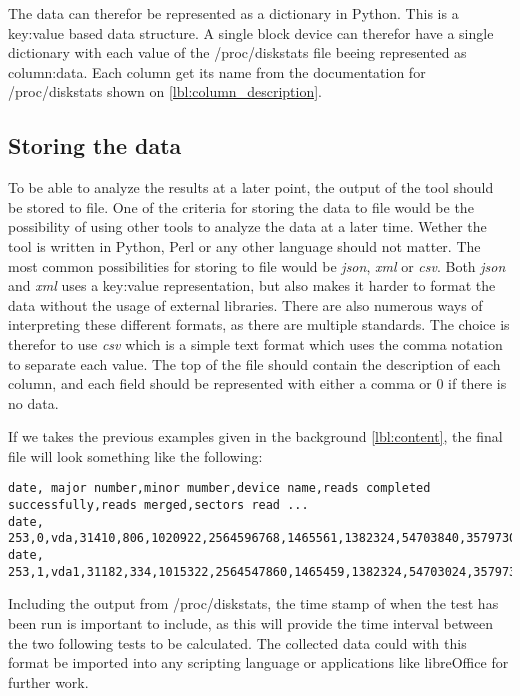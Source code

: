 The data can therefor be represented as a dictionary in Python. This is a
key:value based data structure. A single block device can therefor have a
single dictionary with each value of the /proc/diskstats file beeing
represented as column:data. Each column get its name from the documentation
for /proc/diskstats shown on \vref{lbl:column_description}.

\subsection{Storing the data}
To be able to analyze the results at a later point, the output of the tool
should be stored to file. One of the criteria for storing the data to file
would be the possibility of using other tools to analyze the data at a later
time. Wether the tool is written in Python, Perl or any other language should
not matter. The most common possibilities for storing to file would be
\textit{json}, \textit{xml} or \textit{csv}. Both \textit{json} and
\textit{xml} uses a key:value representation, but also makes it harder to
format the data without the usage of external libraries. There are also
numerous ways of interpreting these different formats, as there are multiple
standards. The choice is therefor to use \textit{csv} which is a simple text
format which uses the comma notation to separate each value. The top of the
file should contain the description of each column, and each field should be
represented with either a comma or 0 if there is no data.

If we takes the previous examples given in the background \vref{lbl:content},
the final file will look something like the following:
\begin{center}
\begin{lstlisting}[label=lbl:possible_output,caption=Possible output of
monitoring tool,numbers=none]
date, major number,minor mumber,device name,reads completed successfully,reads merged,sectors read ...
date, 253,0,vda,31410,806,1020922,2564596768,1465561,1382324,54703840,3579730636,0,7229708,40955272
date, 253,1,vda1,31182,334,1015322,2564547860,1465459,1382324,54703024,3579730152,0,7229220,40954784
\end{lstlisting}
\end{center}

Including the output from /proc/diskstats, the time stamp of when the test has
been run is important to include, as this will provide the time interval
between the two following tests to be calculated.
The collected data could with this format be imported into any scripting
language or applications like libreOffice for further work.

